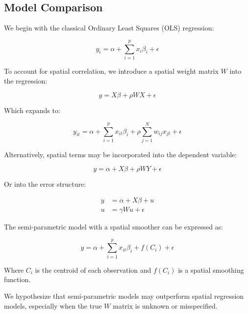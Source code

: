\documentclass{article}
\begin{document}
\subsection{Model Comparison}
We begin with the classical Ordinary Least Squares (OLS) regression:

\begin{equation}
	y_i = \alpha + \sum^p_{i=1} x_i \beta_i + \epsilon
	\label{eq:OLS}
\end{equation}

To account for spatial correlation, we introduce a spatial weight matrix $W$ into the regression:

\begin{equation}
	y = X \beta + \rho W X + \epsilon
	\label{eq:SDM}
\end{equation}

Which expands to:

\begin{equation}
	y_{it} = \alpha + \sum^p_{i=1} x_{it} \beta_i + \rho \sum^N_{j=1} w_{ij} x_{jt} + \epsilon
	\label{eq:SDM_exp}
\end{equation}

Alternatively, spatial terms may be incorporated into the dependent variable:

\begin{equation}
	y = \alpha + X \beta + \rho W Y + \epsilon
	\label{eq:SAR}
\end{equation}

Or into the error structure:

\begin{equation}
	\begin{split}
		y & = \alpha + X \beta + u  \\
		u & = \gamma W u + \epsilon
	\end{split}
	\label{eq:SEM}
\end{equation}

The semi-parametric model with a spatial smoother can be expressed as:

\begin{equation}
	y = \alpha + \sum^p_{i=1} x_{it} \beta_i + f(C_i) + \epsilon
	\label{eq:tensor}
\end{equation}

Where $C_i$ is the centroid of each observation and $f(C_i)$ is a spatial smoothing function.

We hypothesize that semi-parametric models may outperform spatial regression models, especially when the true $W$ matrix is unknown or misspecified.
\end{document}

